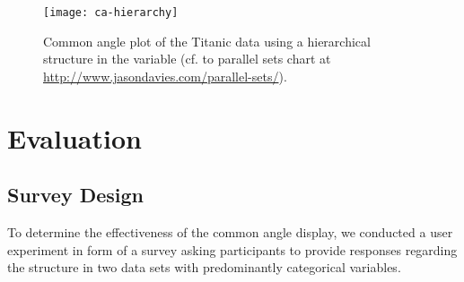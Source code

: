 \begin{figure}[hbtp]
%
%
%
%
%
%
%
%
%
%
%
\texttt{[image: ca-hierarchy]}
\caption{\label{tit-hierarchy} Common angle plot of the Titanic data using a hierarchical structure in the variable (cf. to parallel sets chart at \protect\url{http://www.jasondavies.com/parallel-sets/}). }
\end{figure}


\section{Evaluation}
\subsection{Survey Design}
To determine the effectiveness of the common angle display, we conducted a user experiment in form of a survey asking participants to provide responses regarding the structure in two data sets with predominantly categorical variables.


